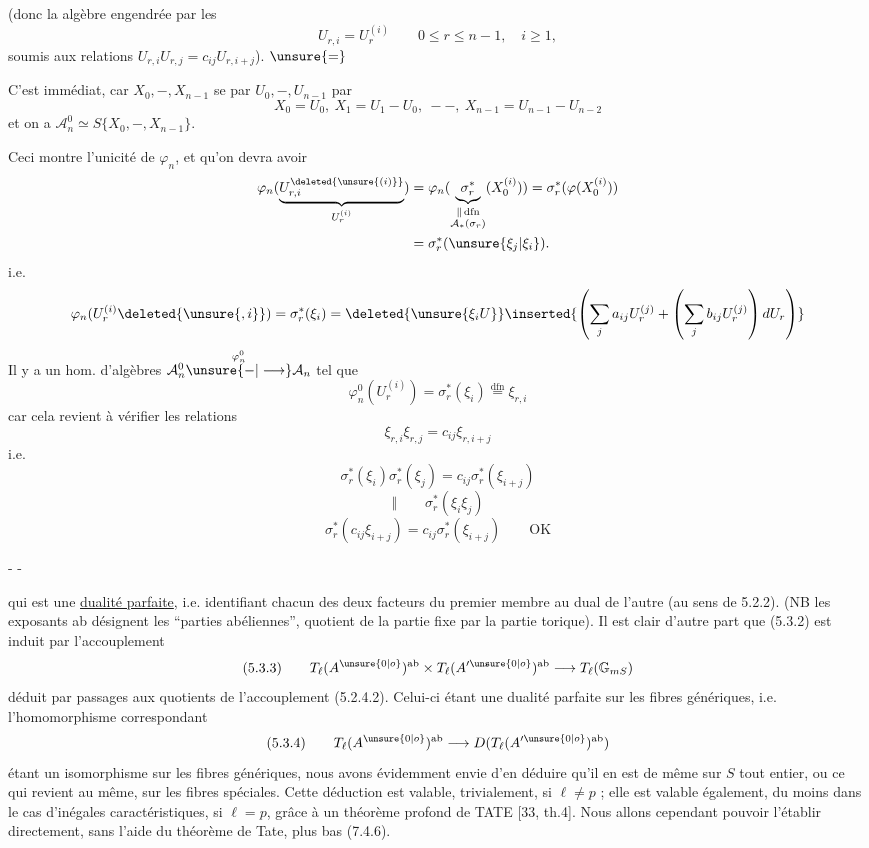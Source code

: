  (donc la algèbre engendrée par les
\[
U_{r,i}=U_r^{(i)}\qquad0\le r\le n-1,\quad i\ge1,
\]
soumis aux relations $U_{r,i}U_{r,j}=c_{ij}U_{r,i+j}$).  $\unsure{=}$

C'est immédiat, car $X_0,-,X_{n-1}$ se  par $U_0,-,U_{n-1}$ par
\[
X_0=U_0,\ X_1=U_1-U_0,\ --,\ X_{n-1}=U_{n-1}-U_{n-2}
\]
et on a $\mathcal A_n^0\simeq S\{X_0,-,X_{n-1}\}$. 

Ceci montre l'unicité de $\varphi_n$, et qu'on devra avoir
\[
\begin{aligned}
\varphi_n(\underbrace{U_{r,i}^{\deleted{\unsure{(i)}}}}_{U_r^{(i)}})
&=\varphi_n(\underbrace{\sigma_r^*}_{\substack{\Vert\,\mathrm{dfn}\\\mathcal A_*(\sigma_r)}}(X_0^{(i)}))
=\sigma_r^*(\varphi(X_0^{(i)}))\\
&=\sigma_r^*(\unsure{\xi_j|\xi_i}).
\end{aligned}
\]
i.e.
\[
\varphi_n(U_r^{(i)}\deleted{\unsure{,i}})=\sigma_r^*(\xi_i)=\deleted{\unsure{\xi_iU}}
\inserted{\left(\sum_j a_{ij}U_r^{(j)}+\left(\sum_j b_{ij}U_r^{(j)}\right)dU_r\right)}
\]
Il y a  un hom. d'algèbres  $\mathcal A_n^0\overset{\varphi_n^0}{\unsure{-|\longrightarrow}}\mathcal A_n$ tel que
\[
\varphi_n^0(U_r^{(i)})=\sigma_r^*(\xi_i)\overset{\mathrm{dfn}}=\xi_{r,i}
\]
car cela revient à vérifier les relations
\[
\xi_{r,i}\xi_{r,j}=c_{ij}\xi_{r,i+j}
\]
i.e.
\[
\sigma_r^*(\xi_i)\sigma_r^*(\xi_j)=c_{ij}\sigma_r^*(\xi_{i+j})
\]
\[
\Vert\qquad\sigma_r^*(\xi_i\xi_j)
\]
\[
\sigma_r^*(c_{ij}\xi_{i+j})=c_{ij}\sigma_r^*(\xi_{i+j})\qquad\text{OK}
\]

\begin{center}-  -\end{center}

qui est une \uline{dualité parfaite}, i.e. identifiant chacun des deux facteurs du premier membre au dual de l'autre (au sens de 5.2.2). (NB les exposants ab désignent les ``parties abéliennes'', quotient de la partie fixe par la partie torique). Il est clair d'autre part que (5.3.2) est induit par l'accouplement
\[
(5.3.3)\qquad T_\ell(A^{\unsure{0|o}})^{\mathrm{ab}}\times T_\ell(A'^{\unsure{0|o}})^{\mathrm{ab}}\longrightarrow T_\ell(\mathbb G_{mS})
\]
déduit par passages aux quotients de l'accouplement (5.2.4.2). Celui-ci étant une dualité parfaite sur les fibres génériques, i.e. l'homomorphisme correspondant
\[
(5.3.4)\qquad T_\ell(A^{\unsure{0|o}})^{\mathrm{ab}}\longrightarrow D(T_\ell(A'^{\unsure{0|o}})^{\mathrm{ab}})
\]
étant un isomorphisme sur les fibres génériques, nous avons évidemment envie d'en déduire qu'il en est de même sur $S$ tout entier, ou ce qui revient au même, sur les fibres spéciales. Cette déduction est valable, trivialement, si $\ell\ne p$ ; elle est valable également, du moins dans le cas d'inégales caractéristiques, si $\ell=p$, grâce à un théorème profond de TATE [33, th.4]. Nous allons cependant pouvoir l'établir directement, sans l'aide du théorème de Tate, plus bas (7.4.6).


